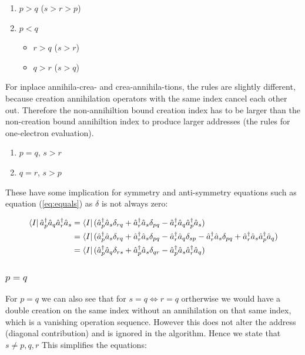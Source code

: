 \documentclass[12p]{article}
\begin{document}
\begin{enumerate}
  \item $p > q$ ($s > r > p$)
  \item $p < q$
  \begin{itemize}
    \item $r > q$ ($s > r$)
    \item $q > r$ ($s > q$)
  \end{itemize}
\end{enumerate}
For inplace annihila-crea- and crea-annihila-tions, the rules are slightly different, because creation annihilation operators with the same index cancel each other out. Therefore the non-annihiltion bound creation index has to be larger than the non-creation bound annihiltion index to produce larger addresses (the rules for one-electron evaluation).

\begin{enumerate}
  \item $p = q$, $s > r$
  \item $q = r$, $s > p$
\end{enumerate}
These have some implication for symmetry and anti-symmetry equations such as equation (\ref{eq:equals}) as $\delta$ is not always zero:


\begin{align}
   \bra{I}  \hat{a}^\dagger_p \hat{a}_q \hat{a}^\dagger_r \hat{a}_s & =   \bra{I} (\hat{a}^\dagger_p \hat{a}_s \delta_{rq} + \hat{a}^\dagger_r  \hat{a}_s \delta_{pq} - \hat{a}^\dagger_r \hat{a}_q \hat{a}^\dagger_p \hat{a}_s) \\
  & =   \bra{I} (\hat{a}^\dagger_p \hat{a}_s \delta_{rq} + \hat{a}^\dagger_r \hat{a}_s \delta_{pq} - \hat{a}^\dagger_r \hat{a}_q  \delta_{sp} - \hat{a}^\dagger_r \hat{a}_s \delta_{pq} + \hat{a}^\dagger_r \hat{a}_s \hat{a}^\dagger_p \hat{a}_q) \\
  & =   \bra{I} (\hat{a}^\dagger_p \hat{a}_q \delta_{rs} + \hat{a}^\dagger_p \hat{a}_s \delta_{qr} - \hat{a}^\dagger_p \hat{a}_s \hat{a}^\dagger_r \hat{a}_q)
\end{align}

\subsubsection{$p = q$} \label{p=q}
For $p = q$ we can also see that for $s = q \iff r = q$ ortherwise we would have a double creation on the same index without an annihilation on that same index, which is a vanishing operation sequence. However this does not alter the address (diagonal contribution) and is ignored in the algorithm. Hence we state that $ s \neq p, q, r $ This simplifies the equations:
\end{document}
